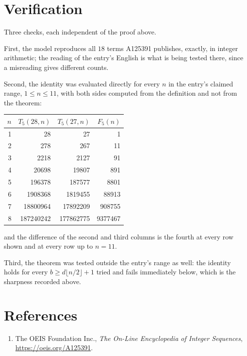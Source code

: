 \documentclass[11pt,a4paper]{article}
\theoremstyle{plain}
\theoremstyle{definition}
\begin{document}
\section{Verification}

Three checks, each independent of the proof above.

First, the model reproduces all $18$ terms A125391 publishes, exactly, in integer
arithmetic; the reading of the entry's English is what is being tested there, since a
misreading gives different counts.

Second, the identity was evaluated directly for every $n$ in the entry's claimed range,
$1\le n\le11$, with both sides computed from the definition and not from the theorem:

\begin{center}
\begin{tabular}{rrrr}
$n$ & $T_{5}(28,n)$ & $T_{5}(27,n)$ & $F_{5}(n)$ \\ \hline
1 & 28 & 27 & 1 \\
2 & 278 & 267 & 11 \\
3 & 2218 & 2127 & 91 \\
4 & 20698 & 19807 & 891 \\
5 & 196378 & 187577 & 8801 \\
6 & 1908368 & 1819455 & 88913 \\
7 & 18800964 & 17892209 & 908755 \\
8 & 187240242 & 177862775 & 9377467 \\
\end{tabular}
\end{center}

\noindent and the difference of the second and third columns is the fourth at every row shown
and at every row up to $n=11$.

Third, the theorem was tested outside the entry's range as well: the identity holds for every
$b\ge d\lfloor n/2\rfloor+1$ tried and fails immediately below, which is the sharpness recorded
above.

\section*{References}
\begin{enumerate}
\item The OEIS Foundation Inc., \emph{The On-Line Encyclopedia of Integer Sequences},
\url{https://oeis.org/A125391}.
\end{enumerate}
\end{document}
